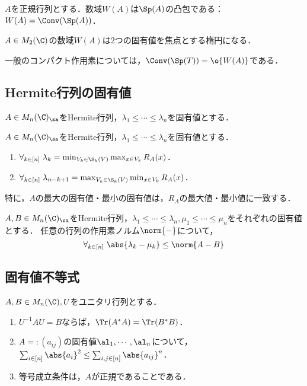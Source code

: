 \documentclass[uplatex, dvipdfmx]{jsreport}
\begin{document}
\begin{theorem}
    $A$を正規行列とする．数域$W(A)$は$\Sp(A)$の凸包である：$W(A)=\Conv(\Sp(A))$．
\end{theorem}
\begin{example}
    $A\in M_2(\C)$の数域$W(A)$は2つの固有値を焦点とする楕円になる．
\end{example}
\begin{remark}
    一般のコンパクト作用素については，$\Conv(\Sp(T))=\o{W(A)}$である．
\end{remark}

\subsection{Hermite行列の固有値}

\begin{theorem}
    $A\in M_n(\C)_\sa$をHermite行列，$\lambda_1\le\cdots\le\lambda_n$を固有値とする．
\end{theorem}

\begin{theorem}
    $A\in M_n(\C)_\sa$をHermite行列，$\lambda_1\le\cdots\le\lambda_n$を固有値とする．
    \begin{enumerate}
        \item $\forall_{k\in[n]}\;\lambda_k=\min_{V_k\in\S_k(V)}\max_{x\in V_k}R_A(x)$．
        \item $\forall_{k\in[n]}\;\lambda_{n-k+1}=\max_{V_k\in\S_k(V)}\min_{x\in V_k}R_A(x)$．
    \end{enumerate}
    特に，$A$の最大の固有値・最小の固有値は，$R_A$の最大値・最小値に一致する．
\end{theorem}


\begin{theorem}[摂動定理]
    $A,B\in M_n(\C)_\sa$をHermite行列，$\lambda_1\le\cdots\le\lambda_n,\mu_1\le\cdots\le\mu_n$をそれぞれの固有値とする．
    任意の行列の作用素ノルム$\norm{-}$について，
    \[\forall_{k\in[n]}\;\abs{\lambda_k-\mu_k}\le\norm{A-B}\]
\end{theorem}

\subsection{固有値不等式}

\begin{proposition}
    $A,B\in M_n(\C),U$をユニタリ行列とする．
    \begin{enumerate}
        \item $U^{-1}AU=B$ならば，$\Tr(A^*A)=\Tr(B^*B)$．
        \item $A=:(a_{ij})$の固有値$\al_1,\cdots,\al_n$について，$\sum_{i\in[n]}\abs{a_i}^2\le\sum_{i,j\in[n]}\abs{a_{ij}}^n$．
        \item 等号成立条件は，$A$が正規であることである．
    \end{enumerate}
\end{proposition}
\end{document}
